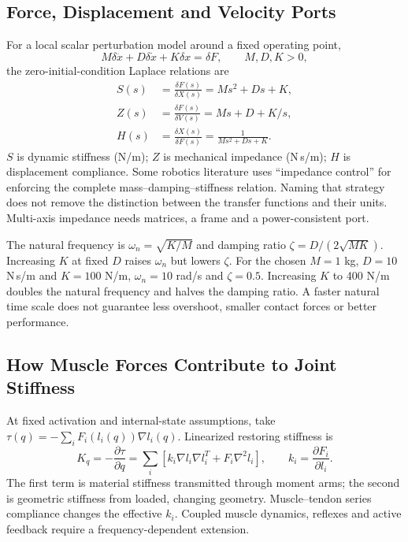 \subsection{Force, Displacement and Velocity Ports}

For a local scalar perturbation model around a fixed operating point,
\begin{equation}
M\delta\ddot x+D\delta\dot x+K\delta x=\delta F,
\qquad M,D,K>0,
\label{eq:ch8:impedance-time}
\end{equation}
the zero-initial-condition Laplace relations are
\begin{align}
S(s)&=\frac{\delta F(s)}{\delta X(s)}=Ms^2+Ds+K,
\label{eq:ch8:dynamic-stiffness}\\
Z(s)&=\frac{\delta F(s)}{\delta V(s)}=Ms+D+K/s,
\label{eq:ch8:impedance-laplace}\\
H(s)&=\frac{\delta X(s)}{\delta F(s)}=\frac1{Ms^2+Ds+K}.
\end{align}
$S$ is dynamic stiffness (N/m); $Z$ is mechanical impedance (N\,s/m); $H$
is displacement compliance. Some robotics literature uses ``impedance control''
for enforcing the complete mass--damping--stiffness relation. Naming that strategy
does not remove the distinction between the transfer functions and their units.
Multi-axis impedance needs matrices, a frame and a power-consistent port.

The natural frequency is $\omega_n=\sqrt{K/M}$ and damping ratio
$\zeta=D/(2\sqrt{MK})$. Increasing $K$ at fixed $D$ raises $\omega_n$ but lowers
$\zeta$. For the chosen $M=1$ kg, $D=10$ N\,s/m and $K=100$ N/m,
$\omega_n=10$ rad/s and $\zeta=0.5$. Increasing $K$ to 400 N/m doubles the
natural frequency and halves the damping ratio. A faster natural time scale
does not guarantee less overshoot, smaller contact forces or better performance.

\subsection{How Muscle Forces Contribute to Joint Stiffness}

At fixed activation and internal-state assumptions, take
$\tau(q)=-\sum_i F_i(l_i(q))\nabla l_i(q)$. Linearized restoring stiffness is
\begin{equation}
K_q=-\frac{\partial\tau}{\partial q}
=\sum_i\left[
k_i\nabla l_i\nabla l_i^T+F_i\nabla^2l_i\right],
\qquad k_i=\frac{\partial F_i}{\partial l_i}.
\label{eq:ch8:cocontraction-stiffness}
\end{equation}
The first term is material stiffness transmitted through moment arms; the
second is geometric stiffness from loaded, changing geometry. Muscle--tendon
series compliance changes the effective $k_i$. Coupled muscle dynamics,
reflexes and active feedback require a frequency-dependent extension.

